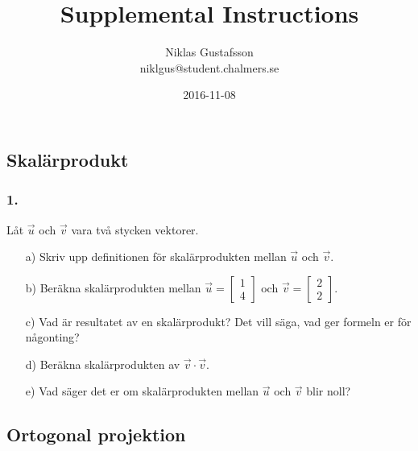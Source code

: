 \documentclass{article}
\title{Supplemental Instructions}
\author{Niklas Gustafsson \\ 
		\small{niklgus@student.chalmers.se}
}
\date{
      2016-11-08
     }
\begin{document}
\maketitle
\subsection*{Skalärprodukt}
\subsubsection*{1.}
Låt $\vec{u}$ och $\vec{v}$ vara två stycken vektorer.
\begin{itemize}
\item[a) ] Skriv upp definitionen för skalärprodukten mellan $\vec{u}$ och $\vec{v}$.
\item[b) ] Beräkna skalärprodukten mellan $\vec{u} = \begin{bmatrix} 1 \\ 4 \end{bmatrix}$ och $\vec{v} = \begin{bmatrix} 2 \\ 2 \end{bmatrix}.$
\item[c) ] Vad är resultatet av en skalärprodukt? Det vill säga, vad ger formeln er för någonting?
\item[d) ] Beräkna skalärprodukten av $\vec{v} \cdot \vec{v}$.
\item[e) ] Vad säger det er om skalärprodukten mellan $\vec{u}$ och $\vec{v}$ blir noll?
\end{itemize}

\subsection*{Ortogonal projektion}
\end{document}
